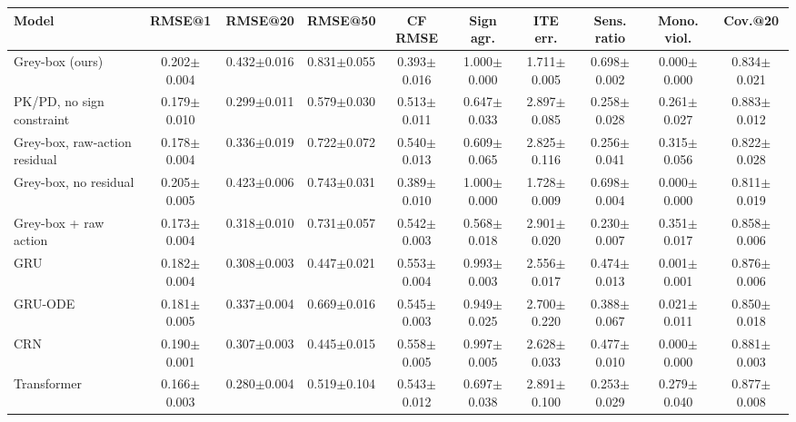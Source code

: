 \begin{tabular}{lccccccccc}
\toprule
Model & RMSE@1 & RMSE@20 & RMSE@50 & CF RMSE & Sign agr. & ITE err. & Sens. ratio & Mono. viol. & Cov.@20 \\
\midrule
Grey-box (ours) & 0.202$\pm$0.004 & 0.432$\pm$0.016 & 0.831$\pm$0.055 & 0.393$\pm$0.016 & 1.000$\pm$0.000 & 1.711$\pm$0.005 & 0.698$\pm$0.002 & 0.000$\pm$0.000 & 0.834$\pm$0.021 \\
PK/PD, no sign constraint & 0.179$\pm$0.010 & 0.299$\pm$0.011 & 0.579$\pm$0.030 & 0.513$\pm$0.011 & 0.647$\pm$0.033 & 2.897$\pm$0.085 & 0.258$\pm$0.028 & 0.261$\pm$0.027 & 0.883$\pm$0.012 \\
Grey-box, raw-action residual & 0.178$\pm$0.004 & 0.336$\pm$0.019 & 0.722$\pm$0.072 & 0.540$\pm$0.013 & 0.609$\pm$0.065 & 2.825$\pm$0.116 & 0.256$\pm$0.041 & 0.315$\pm$0.056 & 0.822$\pm$0.028 \\
Grey-box, no residual & 0.205$\pm$0.005 & 0.423$\pm$0.006 & 0.743$\pm$0.031 & 0.389$\pm$0.010 & 1.000$\pm$0.000 & 1.728$\pm$0.009 & 0.698$\pm$0.004 & 0.000$\pm$0.000 & 0.811$\pm$0.019 \\
Grey-box + raw action & 0.173$\pm$0.004 & 0.318$\pm$0.010 & 0.731$\pm$0.057 & 0.542$\pm$0.003 & 0.568$\pm$0.018 & 2.901$\pm$0.020 & 0.230$\pm$0.007 & 0.351$\pm$0.017 & 0.858$\pm$0.006 \\
GRU & 0.182$\pm$0.004 & 0.308$\pm$0.003 & 0.447$\pm$0.021 & 0.553$\pm$0.004 & 0.993$\pm$0.003 & 2.556$\pm$0.017 & 0.474$\pm$0.013 & 0.001$\pm$0.001 & 0.876$\pm$0.006 \\
GRU-ODE & 0.181$\pm$0.005 & 0.337$\pm$0.004 & 0.669$\pm$0.016 & 0.545$\pm$0.003 & 0.949$\pm$0.025 & 2.700$\pm$0.220 & 0.388$\pm$0.067 & 0.021$\pm$0.011 & 0.850$\pm$0.018 \\
CRN & 0.190$\pm$0.001 & 0.307$\pm$0.003 & 0.445$\pm$0.015 & 0.558$\pm$0.005 & 0.997$\pm$0.005 & 2.628$\pm$0.033 & 0.477$\pm$0.010 & 0.000$\pm$0.000 & 0.881$\pm$0.003 \\
Transformer & 0.166$\pm$0.003 & 0.280$\pm$0.004 & 0.519$\pm$0.104 & 0.543$\pm$0.012 & 0.697$\pm$0.038 & 2.891$\pm$0.100 & 0.253$\pm$0.029 & 0.279$\pm$0.040 & 0.877$\pm$0.008 \\
\bottomrule
\end{tabular}
